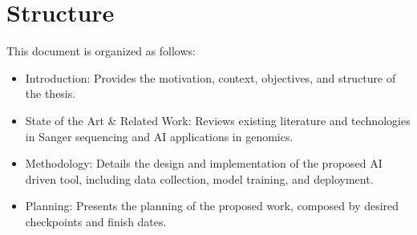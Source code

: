 \section{Structure}
\label{sec:Structure}

This document is organized as follows:

\begin{itemize}
  \item Introduction: Provides the motivation, context, objectives, and structure of the thesis.
  \item State of the Art \& Related Work: Reviews existing literature and technologies in Sanger sequencing and AI applications in genomics.
  \item Methodology: Details the design and implementation of the proposed AI driven tool, including data collection, model training, and deployment.
  \item Planning: Presents the planning of the proposed work, composed by desired checkpoints and finish dates.
  \end{itemize}
